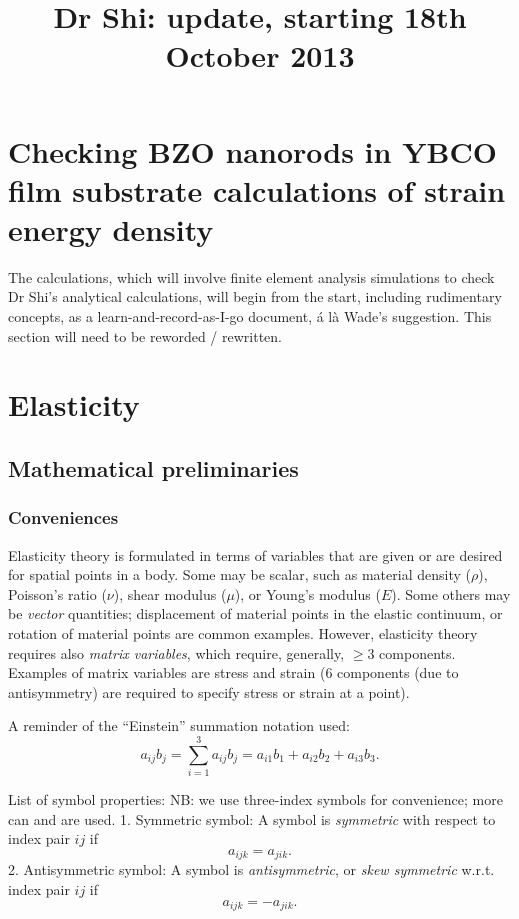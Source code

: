 \documentclass[aps,preprint]{revtex4-1}
\begin{document}
\title{Dr Shi: update, starting 18th October 2013}
\tableofcontents

\section{Checking BZO nanorods in YBCO film substrate calculations of strain energy density}
The calculations, which will involve finite element analysis simulations to check Dr Shi's analytical calculations, will begin from the start, including rudimentary concepts, as a learn-and-record-as-I-go document, \'{a} l\`{a} Wade's suggestion. This section will need to be reworded / rewritten.


\section{Elasticity}
\subsection{Mathematical preliminaries}
\subsubsection{Conveniences}
Elasticity theory is formulated in terms of variables that are given or are desired for spatial points in a body. Some may be scalar, such as material density ($\rho$), Poisson's ratio ($\nu$), shear modulus ($\mu$), or Young's modulus ($E$). Some others may be \emph{vector} quantities; displacement of material points in the elastic continuum, or rotation of material points are common examples. However, elasticity theory requires also \emph{matrix variables}, which require, generally, $\ge 3$ components. Examples of matrix variables are stress and strain ($6$ components (due to antisymmetry) are required to specify stress or strain at a point).

A reminder of the ``Einstein'' summation notation used:
\begin{equation}
a_{ij}b_{j} = \sum_{i=1}^{3}a_{ij}b_{j} = a_{i1}b_{1} + a_{i2}b_{2} + a_{i3}b_{3}.
\end{equation}

List of symbol properties:
NB: we use three-index symbols for convenience; more can and are used.
1. Symmetric symbol:
A symbol is \emph{symmetric} with respect to index pair $ij$ if
\[
a_{ijk} = a_{jik}.
\]
2. Antisymmetric symbol:
A symbol is \emph{antisymmetric}, or \emph{skew symmetric} w.r.t. index pair $ij$ if
\[
a_{ijk} = -a_{jik}.
\]
\end{document}
